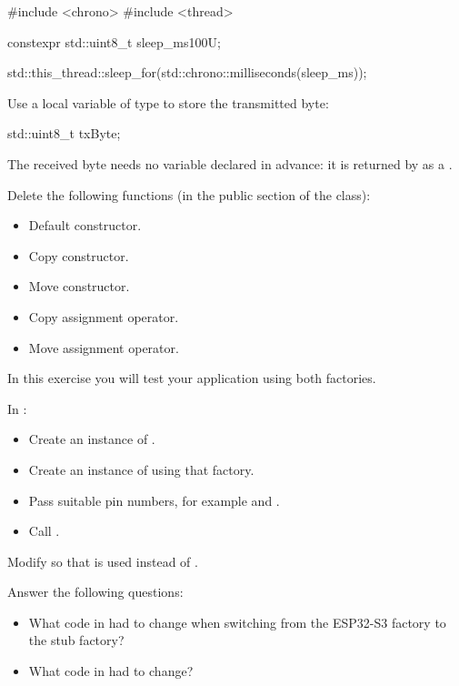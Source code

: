 \begin{cppcode}
#include <chrono>
#include <thread>

constexpr std::uint8_t sleep_ms{100U};

std::this_thread::sleep_for(std::chrono::milliseconds(sleep_ms));
\end{cppcode}

\noindent Use a local variable of type  to store the transmitted byte:

\begin{cppcode}
std::uint8_t txByte{};
\end{cppcode}

\noindent The received byte needs no variable declared in advance: it is returned by
 as a .

Delete the following functions (in the public section of the class):
\begin{itemize}
  \item Default constructor.
  \item Copy constructor.
  \item Move constructor.
  \item Copy assignment operator.
  \item Move assignment operator.
\end{itemize}

\label{c4:ex:3.2}
In this exercise you will test your application using both factories.

In :
\begin{itemize}
  \item Create an instance of .
  \item Create an instance of  using that factory.
  \item Pass suitable pin numbers, for example  and .
  \item Call .
\end{itemize}

Modify  so that  is used instead of
.

Answer the following questions:
\begin{itemize}
  \item What code in  had to change when switching from the ESP32-S3 factory to the
    stub factory?
  \item What code in  had to change?
\end{itemize}

